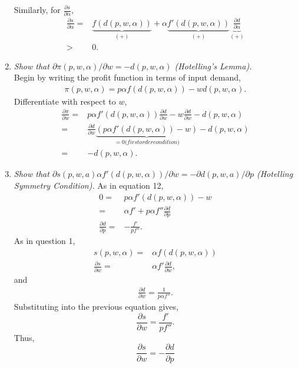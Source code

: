 \documentclass[10pt]{article}
\begin{document}
\begin{enumerate}
  Similarly, for $\frac{\partial s}{\partial \alpha}$,
  \begin{align*}
    \frac{\partial s}{\partial \alpha} = & \underbrace{f(d(p,w,\alpha))}_{(+)} + \alpha
    \underbrace{f'(d(p,w,\alpha))}_{(+)} \underbrace{\frac{\partial
        d}{\partial \alpha} }_{(+)} \\
    > & 0.
  \end{align*}

\item \textit{Show that $\partial \pi(p, w, \alpha)/\partial w = -d(p, w, \alpha)$
    (Hotelling's Lemma).}\\
  Begin by writing the profit function in terms of input demand,
  \begin{align*}
    \pi(p,w,\alpha) = p \alpha f(d(p,w,\alpha)) - w d(p,w,\alpha).
  \end{align*}
  Differentiate with respect to $w$,
  \begin{align*}
    \frac{\partial \pi} {\partial w} = & p \alpha f'(d(p,w,\alpha))
    \frac{\partial d}{\partial w} - w \frac{\partial d}{\partial w} -
    d(p,w,\alpha) \\
    = & \frac{\partial d}{\partial w} \underbrace{\left(p \alpha
        f'(d(p,w,\alpha)) - w \right)}_{=0 \mathrm(first order condition)} - d(p,w,\alpha) \\
    = & -d(p,w,\alpha).
  \end{align*}
\item\textit{Show  that  $\partial s(p, w,  a)\alpha f'(d(p,w,\alpha))/\partial w  =  -\partial
    d(p, w,  a)/\partial p$  (Hotelling  Symmetry Condition).}  
  As in equation 12, 
  \begin{align*}
    0 = & p \alpha f'(d(p,w,\alpha)) - w \\
    = & \alpha f' + p\alpha f'' \frac{\partial d}{\partial p} \\
    \frac{\partial d}{\partial p} = & -\frac{f'}{p f''}.
  \end{align*}
  As in question 1, 
  \begin{align*}
    s(p,w,\alpha) = & \alpha f(d(p,w,\alpha)) \\
    \frac{\partial s}{\partial w} = & \alpha f' \frac{\partial
      d}{\partial w},
  \end{align*}
  and
  \begin{align*}
    \frac{\partial d}{\partial w} = \frac{1}{p \alpha f''}.
  \end{align*}
  Substituting into the previous equation gives, 
  \[ \frac{\partial s}{\partial w} = \frac{f' }{p f''}. \]
  Thus, 
  \[ \frac{\partial s}{\partial w} = -\frac{\partial d}{\partial p} \]
  

\end{enumerate}
\end{document}
